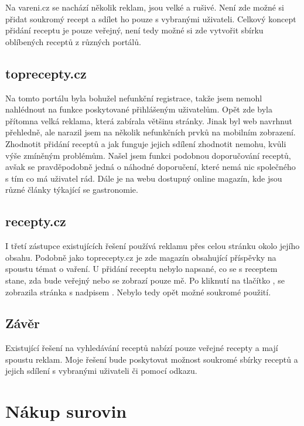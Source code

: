 Na vareni.cz se nachází několik reklam, jsou velké a rušivé. Není zde možné si přidat soukromý recept a sdílet ho
pouze s vybranými uživateli. Celkový koncept přidání receptu je pouze veřejný, není tedy možné si zde vytvořit sbírku
oblíbených receptů z různých portálů.

\subsection{toprecepty.cz}

Na tomto portálu byla bohužel nefunkční registrace, takže jsem nemohl nahlédnout na funkce poskytované přihlášeným
uživatelům. Opět zde byla přítomna velká reklama, která zabírala většinu stránky. Jinak byl web navrhnut přehledně,
ale narazil jsem na několik nefunkčních prvků na mobilním zobrazení. Zhodnotit přidání receptů a jak funguje jejich
sdílení zhodnotit nemohu, kvůli výše zmíněným problémům. Našel jsem funkci podobnou doporučování receptů, avšak se
pravděpodobně jedná o náhodné doporučení, které nemá nic společného s tím co má uživatel rád. Dále je na webu dostupný
online magazín, kde jsou různé články týkající se gastronomie.

\subsection{recepty.cz}

I třetí zástupce existujících řešení používá reklamu přes celou stránku okolo jejího obsahu. Podobně jako toprecepty.cz
je zde magazín obsahující příspěvky na spoustu témat o vaření. U přidání receptu nebylo napsané, co se s receptem stane,
zda bude veřejný nebo se zobrazí pouze mě. Po kliknutí na tlačítko , se zobrazila stránka s nadpisem
. Nebylo tedy opět možné soukromé použití.

\subsection{Závěr}

Existující řešení na vyhledávání receptů nabízí pouze veřejné recepty a mají spoustu reklam. Moje řešení bude poskytovat
možnost soukromé sbírky receptů a jejich sdílení s vybranými uživateli či pomocí odkazu.

\section{Nákup surovin}

